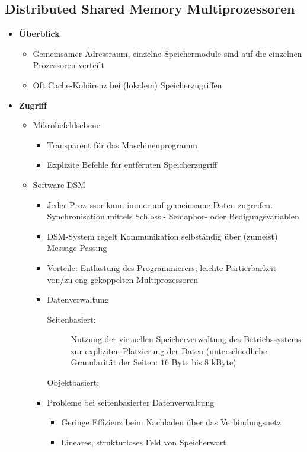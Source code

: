 \subsection{Distributed Shared Memory Multiprozessoren}
\begin{itemize}
	\item \textbf{Überblick}
	\begin{itemize}
		\item Gemeinsamer Adressraum, einzelne Speichermodule sind auf die einzelnen Prozessoren verteilt
		\item Oft Cache-Kohärenz bei (lokalem) Speicherzugriffen
	\end{itemize}
	\item \textbf{Zugriff}
	\begin{itemize}
		\item Mikrobefehlsebene
		\begin{itemize}
			\item Transparent für das Maschinenprogramm
			\item Explizite Befehle für entfernten Speicherzugriff
		\end{itemize}
		\item Software DSM
		\begin{itemize}
			\item Jeder Prozessor kann immer auf gemeinsame Daten zugreifen. Synchronisation mittels Schloss,- Semaphor- oder Bedigungsvariablen
			\item DSM-System regelt Kommunikation selbständig über (zumeist) Message-Passing
			\item Vorteile: Entlastung des Programmierers; leichte Partierbarkeit von/zu eng gekoppelten Multiprozessoren
			\item Datenverwaltung
			\begin{description}
				\item[Seitenbasiert:] Nutzung der virtuellen Speicherverwaltung des Betriebssystems zur expliziten Platzierung der Daten (unterschiedliche Granularität der Seiten: \(16\) Byte bis \(8\) kByte)
				\item[Objektbasiert:] %
			\end{description}
			\item Probleme bei seitenbasierter Datenverwaltung
			\begin{itemize}
				\item Geringe Effizienz beim Nachladen über das Verbindungsnetz
				\item Lineares, strukturloses Feld von Speicherwort

\end{itemize}
\end{itemize}
\end{itemize}
\end{itemize}
